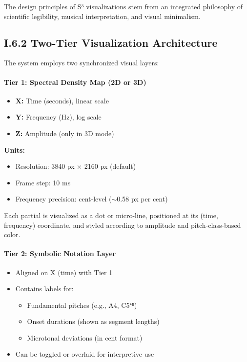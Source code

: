 The design principles of S³ visualizations stem from an integrated philosophy of scientific legibility, musical interpretation, and visual minimalism.

\subsection*{I.6.2 Two-Tier Visualization Architecture}

The system employs two synchronized visual layers:

\paragraph{Tier 1: Spectral Density Map (2D or 3D)}

\begin{itemize}
    \item \textbf{X:} Time (seconds), linear scale
    \item \textbf{Y:} Frequency (Hz), log scale
    \item \textbf{Z:} Amplitude (only in 3D mode)
\end{itemize}

\textbf{Units:}
\begin{itemize}
    \item Resolution: 3840 px × 2160 px (default)
    \item Frame step: 10 ms
    \item Frequency precision: cent-level ($\sim$0.58 px per cent)
\end{itemize}

Each partial is visualized as a dot or micro-line, positioned at its (time, frequency) coordinate, and styled according to amplitude and pitch-class-based color.

\paragraph{Tier 2: Symbolic Notation Layer}

\begin{itemize}
    \item Aligned on X (time) with Tier 1
    \item Contains labels for:
    \begin{itemize}
        \item Fundamental pitches (e.g., A4, C5⁺⁸)
        \item Onset durations (shown as segment lengths)
        \item Microtonal deviations (in cent format)
    \end{itemize}
    \item Can be toggled or overlaid for interpretive use
\end{itemize}

